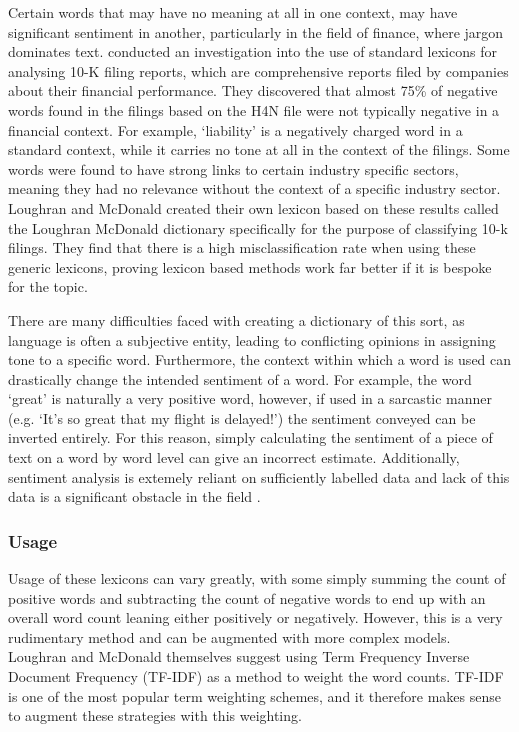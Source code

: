 Certain words that may have no meaning at all in one context, may have significant sentiment in another, particularly in the field of finance, where jargon dominates text. \textcite{lm-dict} conducted an investigation into the use of standard lexicons for analysing 10-K filing reports, which are comprehensive reports filed by companies about their financial performance. They discovered that almost 75\% of negative words found in the filings based on the H4N file were not typically negative in a financial context. For example, `liability' is a negatively charged word in a standard context, while it carries no tone at all in the context of the filings. Some words were found to have strong links to certain industry specific sectors, meaning they had no relevance without the context of a specific industry sector. Loughran and McDonald created their own lexicon based on these results called the Loughran McDonald dictionary specifically for the purpose of classifying 10-k filings. They find that there is a high misclassification rate when using these generic lexicons, proving lexicon based methods work far better if it is bespoke for the topic. 

There are many difficulties faced with creating a dictionary of this sort, as language is often a subjective entity, leading to conflicting opinions in assigning tone to a specific word. Furthermore, the context within which a word is used can drastically change the intended sentiment of a word. For example, the word `great' is naturally a very positive word, however, if used in a sarcastic manner (e.g. `It's so great that my flight is delayed!') the sentiment conveyed can be inverted entirely. For this reason, simply calculating the sentiment of a piece of text on a word by word level can give an incorrect estimate. Additionally, sentiment analysis is extemely reliant on sufficiently labelled data and lack of this data is a significant obstacle in the field \parencite{madhoushi2015sentiment}.

\subsubsection{Usage}
Usage of these lexicons can vary greatly, with some simply summing the count of positive words and subtracting the count of negative words to end up with an overall word count leaning either positively or negatively. However, this is a very rudimentary method and can be augmented with more complex models. Loughran and McDonald themselves suggest using Term Frequency Inverse Document Frequency (TF-IDF) as a method to weight the word counts. TF-IDF is one of the most popular term weighting schemes, and it therefore makes sense to augment these strategies with this weighting.

